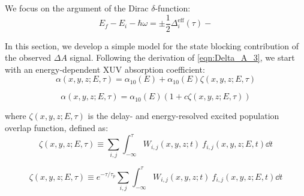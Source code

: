 We focus on the argument of the Dirac $\delta$-function:
\begin{equation}
E_f - E_i - \hbar \omega = \pm \frac{1}{2} \Delta_i^{\textrm{eff}} (\tau) - 
\end{equation}


In this section, we develop a simple model for the state blocking contribution of the observed $\Delta A$ signal. Following the derivation of \cref{eqn:Delta_A_3}, we start with an energy-dependent XUV absorption coefficient:
\begin{equation}
\alpha(x, y, z; E, \tau) = \alpha_{10}(E) + \alpha_{10}(E) \zeta(x, y, z; E, \tau)
\end{equation}

\begin{equation}
\alpha(x, y, z; E, \tau) = \alpha_{10}(E)(1 + c \zeta(x, y, z; E, \tau))
\end{equation}

where $\zeta(x, y, z; E, \tau)$ is the delay- and energy-resolved excited population overlap function, defined as:
\begin{equation}
\zeta(x, y, z; E, \tau) \equiv \sum_{i,j} \int_{-\infty}^{\tau} W_{i,j}(x, y, z; t) \ f_{i,j}(x, y, z; E, t) \dd{t}
\end{equation}

\begin{equation}
\zeta(x, y, z; E, \tau) \equiv e^{-\tau/\tau_p} \sum_{i,j} \int_{-\infty}^{\tau} W_{i,j}(x, y, z; t) \ f_{i,j}(x, y, z; E, t) \dd{t}
\end{equation}

